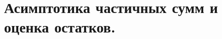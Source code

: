 \documentclass[../main.tex]{subfiles}
\begin{document}
\newpage
\section{Асимптотика частичных сумм и оценка остатков.}
\end{document}

